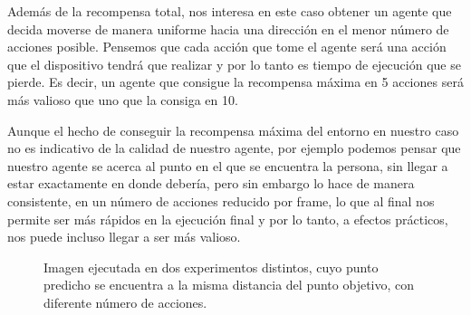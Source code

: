 Además de la recompensa total, nos interesa en este caso obtener un agente que decida moverse de manera uniforme hacia una dirección en el menor número de acciones posible. Pensemos que cada acción que tome el agente será una acción que el dispositivo tendrá que realizar y por lo tanto es tiempo de ejecución que se pierde. Es decir, un agente que consigue la recompensa máxima en 5 acciones será más valioso que uno que la consiga en 10.
\medskip

Aunque el hecho de conseguir la recompensa máxima del entorno en nuestro caso no es indicativo de la calidad de nuestro agente, por ejemplo podemos pensar que nuestro agente se acerca al punto en el que se encuentra la persona, sin llegar a estar exactamente en donde debería, pero sin embargo lo hace de manera consistente, en un número de acciones reducido por frame, lo que al final nos permite ser más rápidos en la ejecución final y por lo tanto, a efectos prácticos, nos puede incluso llegar a ser más valioso.
\medskip

\begin{figure}[ht!]
	\centering
	\hspace{0.05\textwidth}
	\caption[Imagen ejecutada en dos experimentos distintos, a la misma distancia del punto objetivo, con diferente número de acciones.]{Imagen ejecutada en dos experimentos distintos, cuyo punto predicho se encuentra a la misma distancia del punto objetivo, con diferente número de acciones.}%
	\label{fig-comparacion-numero-de-acciones}
  \end{figure}
\medskip

